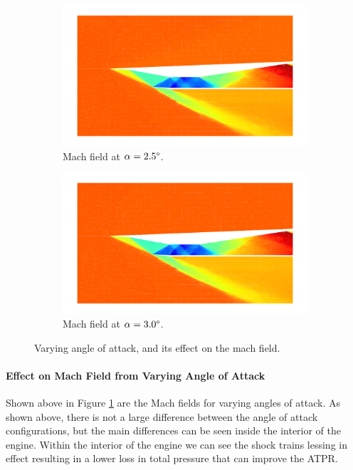 \begin{figure}[h]
    \begin{subfigure}[h]{0.48\linewidth}
        \centering
        \includegraphics[width=\linewidth]{rep/q5/mach_a25.pdf}
        \caption{Mach field at $\alpha=2.5\degree$.}
    \end{subfigure}
    \begin{subfigure}[h]{0.48\linewidth}
        \centering
        \includegraphics[width=\linewidth]{rep/q5/mach_a30.pdf}
        \caption{Mach field at $\alpha=3.0\degree$.}
    \end{subfigure}
    \caption[Mach Field with Varying Angle of Attack]{Varying angle of attack, and its effect on the mach field.}
    \label{fig:mach_fields}
\end{figure}

\paragraph{Effect on Mach Field from Varying Angle of Attack} Shown above in Figure \ref{fig:mach_fields} are the Mach fields for varying angles of attack. As shown above, there is not a large difference between the angle of attack configurations, but the main differences can be seen inside the interior of the engine. Within the interior of the engine we can see the shock trains lessing in effect resulting in a lower loss in total pressure that can improve the ATPR.

